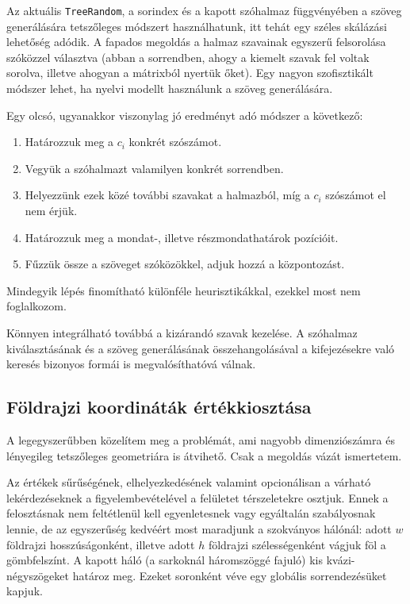 \documentclass[
    parspace,
    noindent,
    nohyp,
]{elteiktdk}[2023/04/10]
\begin{document}
Az aktuális \texttt{TreeRandom}, a sorindex és a kapott szóhalmaz függvényében
a szöveg generálására tetszőleges módszert használhatunk,
itt tehát egy széles skálázási lehetőség adódik.
A fapados megoldás a halmaz szavainak egyszerű felsorolása szóközzel választva
(abban a sorrendben, ahogy a kiemelt szavak fel voltak sorolva, illetve ahogyan a mátrixból nyertük őket).
Egy nagyon szofisztikált módszer lehet, ha nyelvi modellt használunk a szöveg generálására.

Egy olcsó, ugyanakkor viszonylag jó eredményt adó módszer a következő:

\begin{enumerate}
    \item Határozzuk meg a $c_i$ konkrét szószámot.
    \item Vegyük a szóhalmazt valamilyen konkrét sorrendben.
    \item Helyezzünk ezek közé további szavakat a halmazból, míg a $c_i$ szószámot el nem érjük.
    \item Határozzuk meg a mondat-, illetve részmondathatárok pozícióit.
    \item Fűzzük össze a szöveget szóközökkel, adjuk hozzá a központozást.
\end{enumerate}

Mindegyik lépés finomítható különféle heurisztikákkal,
ezekkel most nem foglalkozom.

Könnyen integrálható továbbá a kizárandó szavak kezelése.
A szóhalmaz kiválasztásának és a szöveg generálásának összehangolásával
a kifejezésekre való keresés bizonyos formái is megvalósíthatóvá válnak.

\subsection{Földrajzi koordináták értékkiosztása}

A legegyszerűbben közelítem meg a problémát,
ami nagyobb dimenziószámra és lényegileg tetszőleges geometriára is átvihető.
Csak a megoldás vázát ismertetem.

Az értékek sűrűségének, elhelyezkedésének valamint opcionálisan a várható lekérdezéseknek a
figyelembevételével a felületet térszeletekre osztjuk.
Ennek a felosztásnak nem feltétlenül kell egyenletesnek vagy egyáltalán szabályosnak lennie,
de az egyszerűség kedvéért most maradjunk a szokványos hálónál:
adott $w$ földrajzi hosszúságonként, illetve adott $h$ földrajzi szélességenként vágjuk föl a gömbfelszínt.
A kapott háló (a sarkoknál háromszöggé fajuló) kis kvázi-négyszögeket határoz meg.
Ezeket soronként véve egy globális sorrendezésüket kapjuk.
\end{document}
